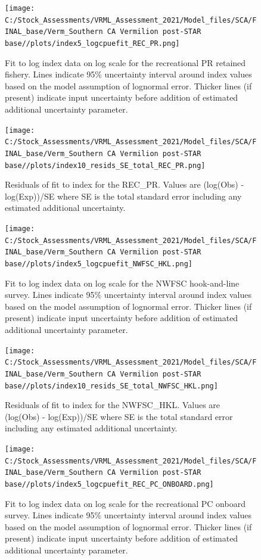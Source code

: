\documentclass[
  english,
  a4paper,
]{article}
\begin{document}
\begin{figure}
\centering
\texttt{[image: C:/Stock\_Assessments/VRML\_Assessment\_2021/Model\_files/SCA/FINAL\_base/Verm\_Southern CA Vermilion post-STAR base//plots/index5\_logcpuefit\_REC\_PR.png]}
\caption{Fit to log index data on log scale for the recreational PR retained fishery. Lines indicate 95\% uncertainty interval around index values based on the model assumption of lognormal error. Thicker lines (if present) indicate input uncertainty before addition of estimated additional uncertainty parameter.\label{fig:log-cpue-REC-PR}}
\end{figure}

\begin{figure}
\centering
\texttt{[image: C:/Stock\_Assessments/VRML\_Assessment\_2021/Model\_files/SCA/FINAL\_base/Verm\_Southern CA Vermilion post-STAR base//plots/index10\_resids\_SE\_total\_REC\_PR.png]}
\caption{Residuals of fit to index for the REC\_PR. Values are (log(Obs) - log(Exp))/SE where SE is the total standard error including any estimated additional uncertainty.\label{fig:cpue-resid-REC-PR}}
\end{figure}

\begin{figure}
\centering
\texttt{[image: C:/Stock\_Assessments/VRML\_Assessment\_2021/Model\_files/SCA/FINAL\_base/Verm\_Southern CA Vermilion post-STAR base//plots/index5\_logcpuefit\_NWFSC\_HKL.png]}
\caption{Fit to log index data on log scale for the NWFSC hook-and-line survey. Lines indicate 95\% uncertainty interval around index values based on the model assumption of lognormal error. Thicker lines (if present) indicate input uncertainty before addition of estimated additional uncertainty parameter.\label{fig:log-cpue-NWFSC-HKL}}
\end{figure}

\begin{figure}
\centering
\texttt{[image: C:/Stock\_Assessments/VRML\_Assessment\_2021/Model\_files/SCA/FINAL\_base/Verm\_Southern CA Vermilion post-STAR base//plots/index10\_resids\_SE\_total\_NWFSC\_HKL.png]}
\caption{Residuals of fit to index for the NWFSC\_HKL. Values are (log(Obs) - log(Exp))/SE where SE is the total standard error including any estimated additional uncertainty.\label{fig:cpue-resid-NWFSC-HKL}}
\end{figure}

\begin{figure}
\centering
\texttt{[image: C:/Stock\_Assessments/VRML\_Assessment\_2021/Model\_files/SCA/FINAL\_base/Verm\_Southern CA Vermilion post-STAR base//plots/index5\_logcpuefit\_REC\_PC\_ONBOARD.png]}
\caption{Fit to log index data on log scale for the recreational PC onboard survey. Lines indicate 95\% uncertainty interval around index values based on the model assumption of lognormal error. Thicker lines (if present) indicate input uncertainty before addition of estimated additional uncertainty parameter.\label{fig:log-cpue-REC-PC-ONBOARD}}
\end{figure}
\end{document}
